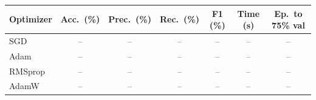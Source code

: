 \begin{tabular}{lcccccc}
\toprule
Optimizer & Acc.\ (\%) & Prec.\ (\%) & Rec.\ (\%) & F1 (\%) & Time (s) & Ep.\ to 75\% val \\
\midrule
SGD & -- & -- & -- & -- & -- & -- \\
Adam & -- & -- & -- & -- & -- & -- \\
RMSprop & -- & -- & -- & -- & -- & -- \\
AdamW & -- & -- & -- & -- & -- & -- \\
\bottomrule
\end{tabular}
